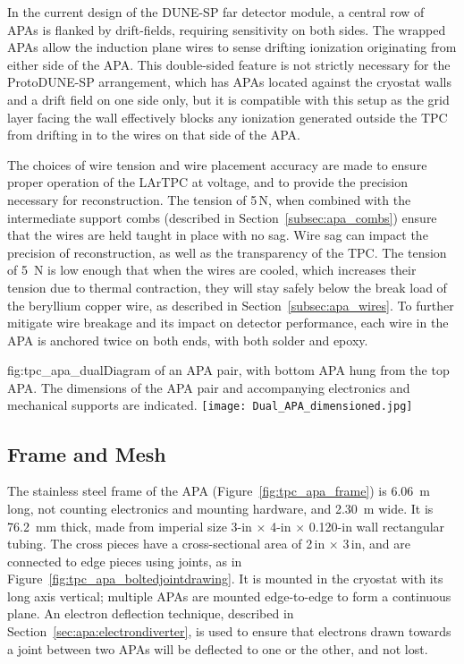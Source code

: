 In the current design of the DUNE-SP far detector module, a central row of APAs is flanked by  drift-fields, requiring sensitivity on both sides. The wrapped APAs allow the induction plane wires to sense drifting ionization originating from either side of the APA.  This double-sided feature is not strictly necessary for the ProtoDUNE-SP arrangement, which has APAs located against the cryostat walls and a drift field on one side only, but it is compatible with this setup as the grid layer facing the wall effectively blocks any ionization generated outside the TPC from drifting in to the wires on that side of the APA.

The choices of wire tension and wire placement accuracy are made to ensure proper operation of the LArTPC at voltage, and to provide the precision necessary for reconstruction.  The tension of 5\,N, when combined with the intermediate support combs (described in Section~\ref{subsec:apa_combs}) ensure that the wires are held taught in place with no sag.  Wire sag can impact the precision of reconstruction, as well as the transparency of the TPC.  The tension of 5~N is low enough that when the wires are cooled, which increases their tension due to thermal contraction, they will stay safely below the break load of the beryllium copper wire, as described in Section~\ref{subsec:apa_wires}.  To further mitigate wire breakage and its impact on detector performance, each wire in the APA is anchored twice on both ends, with both solder and epoxy.  

\begin{dunefigure}{fig:tpc_apa_dual}{Diagram of an APA pair,
    with bottom APA hung from the top APA. The dimensions of the APA pair and
    accompanying electronics and mechanical supports are indicated.}
\texttt{[image: Dual\_APA\_dimensioned.jpg]} 
\end{dunefigure}

\subsection{Frame and Mesh}
\label{sec:fdsp-apa-frames}


The stainless steel frame of the APA (Figure~\ref{fig:tpc_apa_frame}) is 6.06~m long, not counting electronics and mounting hardware, and 2.30~m wide.  It is 76.2~mm thick, made from imperial size 3-in $\times$ 4-in $\times$ 0.120-in wall rectangular tubing.  The cross pieces have a cross-sectional area of 2\,in $\times$ 3\,in, and are connected to edge pieces using joints, as in Figure~\ref{fig:tpc_apa_boltedjointdrawing}.  It is mounted in the cryostat with its long axis vertical; multiple APAs are mounted edge-to-edge to form a continuous plane. An electron deflection technique, described in Section~\ref{sec:apa:electrondiverter}, is used to ensure that electrons drawn towards a joint between two APAs will be deflected to one or the other, and not lost.

